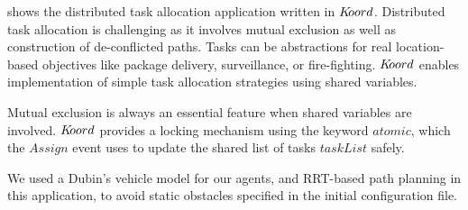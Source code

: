   shows the distributed task allocation application written in $K\kern-2pt oord$. Distributed task allocation is challenging as it involves mutual exclusion as well as construction of de-conflicted  paths. Tasks can be abstractions for real location-based objectives like package delivery, surveillance, or fire-fighting. $K\kern-2pt oord$ enables implementation of simple task allocation strategies using shared variables.

Mutual exclusion is always an essential feature when shared variables are involved. $K\kern-2pt oord$ provides a locking mechanism using the keyword $\mathit{atomic}$, which the $\mathit{Assign}$ event uses to update the shared list of tasks $\mathit{taskList}$ safely. 

We used a Dubin's vehicle model for our agents, and RRT-based path planning in this application, to avoid static obstacles specified in the initial configuration file. 

